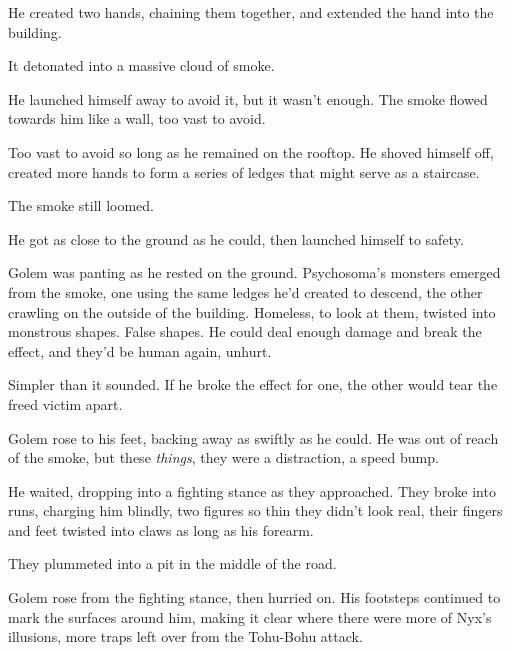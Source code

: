 He created two hands, chaining them together, and extended the hand into the building.



It detonated into a massive cloud of smoke.



He launched himself away to avoid it, but it wasn't enough.  The smoke flowed towards him like a wall, too vast to avoid.



Too vast to avoid so long as he remained on the rooftop.  He shoved himself off, created more hands to form a series of ledges that might serve as a staircase.



The smoke still loomed.



He got as close to the ground as he could, then launched himself to safety.



Golem was panting as he rested on the ground.  Psychosoma's monsters emerged from the smoke, one using the same ledges he'd created to descend, the other crawling on the outside of the building.  Homeless, to look at them, twisted into monstrous shapes.  False shapes.  He could deal enough damage and break the effect, and they'd be human again, unhurt.



Simpler than it sounded.  If he broke the effect for one, the other would tear the freed victim apart.



Golem rose to his feet, backing away as swiftly as he could.  He was out of reach of the smoke, but these \emph{things}, they were a distraction, a speed bump.



He waited, dropping into a fighting stance as they approached.  They broke into runs, charging him blindly, two figures so thin they didn't look real, their fingers and feet twisted into claws as long as his forearm.



They plummeted into a pit in the middle of the road.



Golem rose from the fighting stance, then hurried on.  His footsteps continued to mark the surfaces around him, making it clear where there were more of Nyx's illusions, more traps left over from the Tohu-Bohu attack.



